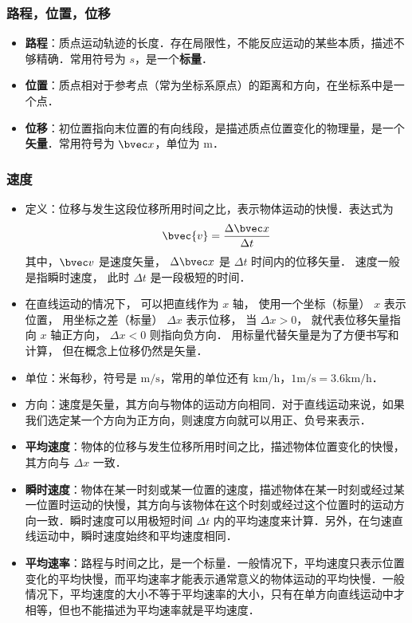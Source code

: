 \subsubsection{路程，位置，位移}
\begin{itemize}
\item \textbf{路程}：质点运动轨迹的长度．存在局限性，不能反应运动的某些本质，描述不够精确．常用符号为 $s$，是一个\textbf{标量}．
\item \textbf{位置}：质点相对于参考点（常为坐标系原点）的距离和方向，在坐标系中是一个点．
\item \textbf{位移}：初位置指向末位置的有向线段，是描述质点位置变化的物理量，是一个\textbf{矢量}．常用符号为 $\bvec x$，单位为 $\mathrm{m}$．
\end{itemize}

\subsubsection{速度}
\begin{itemize}
\item 定义：位移与发生这段位移所用时间之比，表示物体运动的快慢．表达式为
\begin{equation}\label{HSPM01_eq3}
\bvec{v} = \frac{\Delta \bvec x}{\Delta t}
\end{equation}
其中，$\bvec v$ 是速度矢量， $\Delta \bvec x$ 是 $\Delta t$ 时间内的位移矢量． 速度一般是指瞬时速度， 此时 $\Delta t$ 是一段极短的时间．
\item 在直线运动的情况下， 可以把直线作为 $x$ 轴， 使用一个坐标（标量） $x$ 表示位置， 用坐标之差（标量） $\Delta x$ 表示位移， 当 $\Delta x > 0$， 就代表位移矢量指向 $x$ 轴正方向， $\Delta x < 0$ 则指向负方向． 用标量代替矢量是为了方便书写和计算， 但在概念上位移仍然是矢量．
\item 单位：米每秒，符号是 $\mathrm{m/s}$，常用的单位还有 $\mathrm{km/h}$，$1\mathrm{m/s}=3.6\mathrm{km/h}$．
\item 方向：速度是矢量，其方向与物体的运动方向相同．对于直线运动来说，如果我们选定某一个方向为正方向，则速度方向就可以用正、负号来表示．
\item \textbf{平均速度}：物体的位移与发生位移所用时间之比，描述物体位置变化的快慢，其方向与 $\Delta x$ 一致．
\item \textbf{瞬时速度}：物体在某一时刻或某一位置的速度，描述物体在某一时刻或经过某一位置时运动的快慢，其方向与该物体在这个时刻或经过这个位置时的运动方向一致．瞬时速度可以用极短时间 $\Delta t$ 内的平均速度来计算．另外，在匀速直线运动中，瞬时速度始终和平均速度相同．
\item \textbf{平均速率}：路程与时间之比，是一个标量．一般情况下，平均速度只表示位置变化的平均快慢，而平均速率才能表示通常意义的物体运动的平均快慢．一般情况下，平均速度的大小不等于平均速率的大小，只有在单方向直线运动中才相等，但也不能描述为平均速率就是平均速度．
\end{itemize}

